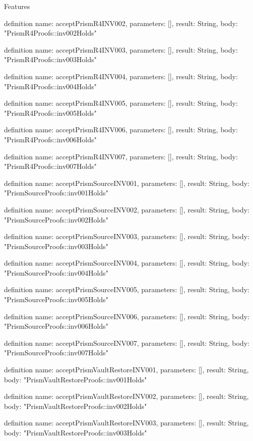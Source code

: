 \begin{lexlean}{Features}
\begin{semanticmodule}
definition{
  name: acceptPrismR4INV002,
  parameters: [],
  result: String,
  body: "PrismR4Proofs::inv002Holds"
}

definition{
  name: acceptPrismR4INV003,
  parameters: [],
  result: String,
  body: "PrismR4Proofs::inv003Holds"
}

definition{
  name: acceptPrismR4INV004,
  parameters: [],
  result: String,
  body: "PrismR4Proofs::inv004Holds"
}

definition{
  name: acceptPrismR4INV005,
  parameters: [],
  result: String,
  body: "PrismR4Proofs::inv005Holds"
}

definition{
  name: acceptPrismR4INV006,
  parameters: [],
  result: String,
  body: "PrismR4Proofs::inv006Holds"
}

definition{
  name: acceptPrismR4INV007,
  parameters: [],
  result: String,
  body: "PrismR4Proofs::inv007Holds"
}

definition{
  name: acceptPrismSourceINV001,
  parameters: [],
  result: String,
  body: "PrismSourceProofs::inv001Holds"
}

definition{
  name: acceptPrismSourceINV002,
  parameters: [],
  result: String,
  body: "PrismSourceProofs::inv002Holds"
}

definition{
  name: acceptPrismSourceINV003,
  parameters: [],
  result: String,
  body: "PrismSourceProofs::inv003Holds"
}

definition{
  name: acceptPrismSourceINV004,
  parameters: [],
  result: String,
  body: "PrismSourceProofs::inv004Holds"
}

definition{
  name: acceptPrismSourceINV005,
  parameters: [],
  result: String,
  body: "PrismSourceProofs::inv005Holds"
}

definition{
  name: acceptPrismSourceINV006,
  parameters: [],
  result: String,
  body: "PrismSourceProofs::inv006Holds"
}

definition{
  name: acceptPrismSourceINV007,
  parameters: [],
  result: String,
  body: "PrismSourceProofs::inv007Holds"
}

definition{
  name: acceptPrismVaultRestoreINV001,
  parameters: [],
  result: String,
  body: "PrismVaultRestoreProofs::inv001Holds"
}

definition{
  name: acceptPrismVaultRestoreINV002,
  parameters: [],
  result: String,
  body: "PrismVaultRestoreProofs::inv002Holds"
}

definition{
  name: acceptPrismVaultRestoreINV003,
  parameters: [],
  result: String,
  body: "PrismVaultRestoreProofs::inv003Holds"
}


\end{semanticmodule}
\end{lexlean}
